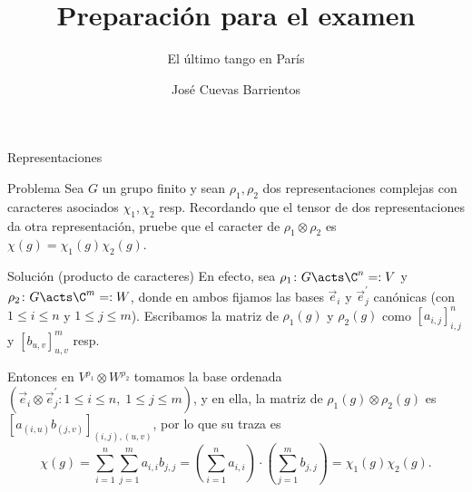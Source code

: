 \documentclass[10pt]{beamer}
\title{Preparación para el examen}
\subtitle{El último tango en París}
\date{\DTMdate{2025-06-26}}
\author{José Cuevas Barrientos}
\begin{document}
\maketitle

\begin{frame}{Representaciones}
	\begin{block}{Problema}
		Sea $G$ un grupo finito y sean $\rho_1, \rho_2$ dos representaciones complejas con caracteres asociados
		$\chi_1, \chi_2$ resp.
		Recordando que el tensor de dos representaciones da otra representación, pruebe que el caracter de
		$\rho_1\otimes \rho_2$ es $\chi(g) = \chi_1(g) \chi_2(g)$.
	\end{block}
\end{frame}
\begin{frame}{Solución (producto de caracteres)}
	En efecto, sea $\rho_1 \colon G \acts \C^n =: V$ y $\rho_2 \colon G \acts \C^m =: W$, donde en ambos fijamos las
	bases $\vec e_i$ y $\vec e_j^\prime$ canónicas (con $1\le i\le n$ y $1\le j\le m$).
	Escribamos la matriz de $\rho_1(g)$ y $\rho_2(g)$ como $[a_{i,j}]_{i,j}^n$ y $[b_{u,v}]_{u,v}^m$ resp.

	\pause
	Entonces en $V^{\rho_1} \otimes W^{\rho_2}$ tomamos la base ordenada $(\vec e_i \otimes \vec e_j^\prime : 1\le i\le n, \;
	1\le j\le m)$, y en ella, la matriz de $\rho_1(g)\otimes \rho_2(g)$ es $[ a_{(i,u)}b_{(j,v)} ]_{(i,j),(u,v)}$,
	por lo que su traza es
	\pause
	\[
		\chi(g) = \sum_{i=1}^{n} \sum_{j=1}^{m} a_{i,i}b_{j,j}
		= \left( \sum_{i=1}^{n} a_{i, i} \right)\cdot \left( \sum_{j=1}^{m} b_{j, j} \right)
		= \chi_1(g) \chi_2(g).
	\]
\end{frame}
\end{document}
